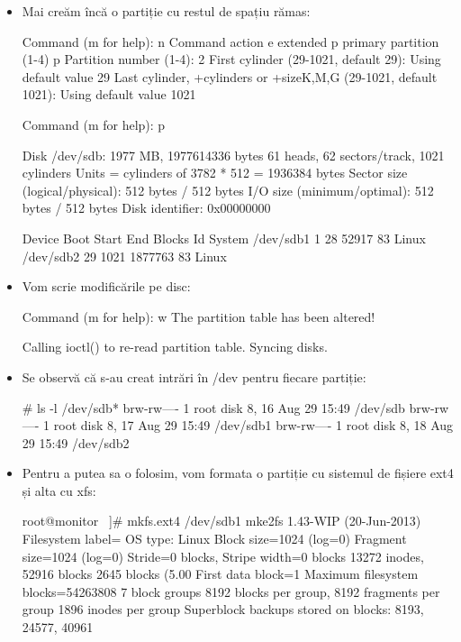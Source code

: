 \begin{itemize}
	\item Mai creăm încă o partiție cu restul de spațiu rămas:

\begin{screen}
Command (m for help): n
Command action
   e   extended
   p   primary partition (1-4)
p
Partition number (1-4): 2
First cylinder (29-1021, default 29):
Using default value 29
Last cylinder, +cylinders or +size{K,M,G} (29-1021, default 1021):
Using default value 1021


Command (m for help): p


Disk /dev/sdb: 1977 MB, 1977614336 bytes
61 heads, 62 sectors/track, 1021 cylinders
Units = cylinders of 3782 * 512 = 1936384 bytes
Sector size (logical/physical): 512 bytes / 512 bytes
I/O size (minimum/optimal): 512 bytes / 512 bytes
Disk identifier: 0x00000000


   Device Boot      Start         End      Blocks   Id  System
/dev/sdb1               1          28       52917   83  Linux
/dev/sdb2              29        1021     1877763   83  Linux
\end{screen}

	\item Vom scrie modificările pe disc:

\begin{screen}
Command (m for help): w
The partition table has been altered!


Calling ioctl() to re-read partition table.
Syncing disks.
\end{screen}

	\item Se observă că s-au creat intrări în /dev pentru fiecare partiție:

\begin{screen}
# ls -l /dev/sdb*
brw-rw---- 1 root disk 8, 16 Aug 29 15:49 /dev/sdb
brw-rw---- 1 root disk 8, 17 Aug 29 15:49 /dev/sdb1
brw-rw---- 1 root disk 8, 18 Aug 29 15:49 /dev/sdb2
\end{screen}

	\item Pentru a putea sa o folosim, vom formata o partiție cu sistemul de
		fișiere ext4 și alta cu xfs:

\begin{screen}
root@monitor ~]# mkfs.ext4 /dev/sdb1
mke2fs 1.43-WIP (20-Jun-2013)
Filesystem label=
OS type: Linux
Block size=1024 (log=0)
Fragment size=1024 (log=0)
Stride=0 blocks, Stripe width=0 blocks
13272 inodes, 52916 blocks
2645 blocks (5.00%
First data block=1
Maximum filesystem blocks=54263808
7 block groups
8192 blocks per group, 8192 fragments per group
1896 inodes per group
Superblock backups stored on blocks:
        8193, 24577, 40961



\end{screen}
\end{itemize}

